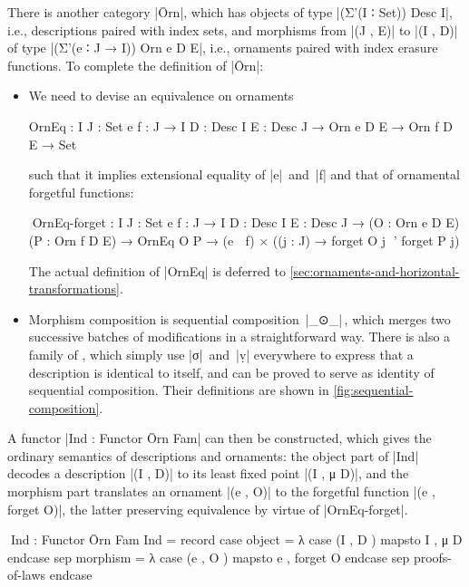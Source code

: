 There is another category |Ōrn|, which has objects of type |(Σ'(I ∶ Set)) Desc I|, i.e., descriptions paired with index sets, and morphisms from |(J , E)| to |(I , D)| of type |(Σ'(e ∶ J → I)) Orn e D E|, i.e., ornaments paired with index erasure functions.
To complete the definition of |Ōrn|:
\begin{itemize}
\item We need to devise an equivalence on ornaments
\begin{code}
OrnEq :  {I J : Set} {e f : J → I} {D : Desc I} {E : Desc J} →
         Orn e D E → Orn f D E → Set
\end{code}
such that it implies extensional equality of |e|~and~|f| and that of ornamental forgetful functions:
\begin{code}
^^^OrnEq-forget :  {I J : Set} {e f : J → I} {D : Desc I} {E : Desc J} →
                   (O : Orn e D E) (P : Orn f D E) → OrnEq O P →
                   (e ≐ f) × ((j : J) → forget O {j} ≊' forget P {j})
\end{code}
The actual definition of |OrnEq| is deferred to \autoref{sec:ornaments-and-horizontal-transformations}.

\item Morphism composition is sequential composition~|_⊙_|\,, which merges two successive batches of modifications in a straightforward way.
There is also a family of , which simply use |σ|~and~|ṿ| everywhere to express that a description is identical to itself, and can be proved to serve as identity of sequential composition.
Their definitions are shown in \autoref{fig:sequential-composition}.
\end{itemize}

A functor |Ind : Functor Ōrn Fam| can then be constructed, which gives the ordinary semantics of descriptions and ornaments: the object part of |Ind| decodes a description |(I , D)| to its least fixed point |(I , μ D)|, and the morphism part translates an ornament |(e , O)| to the forgetful function |(e , forget O)|, the latter preserving equivalence by virtue of |OrnEq-forget|.
\begin{code}
^^^Ind : Functor Ōrn Fam
Ind = record  case  object    =  λ case (I , D  ) mapsto I , μ D       endcase
              sep   morphism  =  λ case (e , O  ) mapsto e , forget O  endcase
              sep   proofs-of-laws endcase
\end{code}

